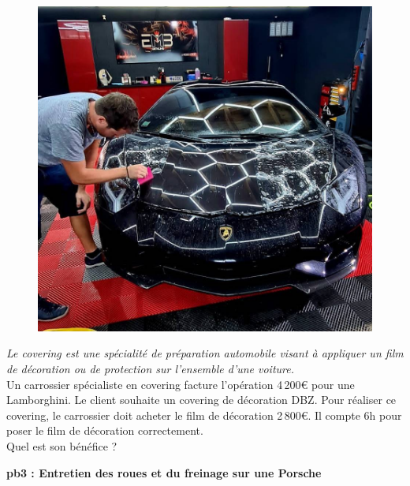 \begin{multicols}{2} 
  \begin{figure}[H]
    \centering
    \includegraphics[width=0.6\linewidth]{5x2-inegalite-triangulaire/lambo.jpg}
  \end{figure} \columnbreak

  \textit{Le covering est une spécialité de préparation automobile visant à appliquer un film de décoration ou de protection sur l'ensemble d'une voiture.} \\

  Un carrossier spécialiste en covering facture l'opération 4\,200€ pour une Lamborghini. Le client souhaite un covering de décoration DBZ.
  Pour réaliser ce covering, le carrossier doit acheter le film de décoration 2\,800€. Il compte 6h pour poser le film de décoration correctement. \\

  Quel est son bénéfice ? 
\end{multicols}

\newpage

\textbf{pb3 : Entretien des roues et du freinage sur une Porsche} \\

